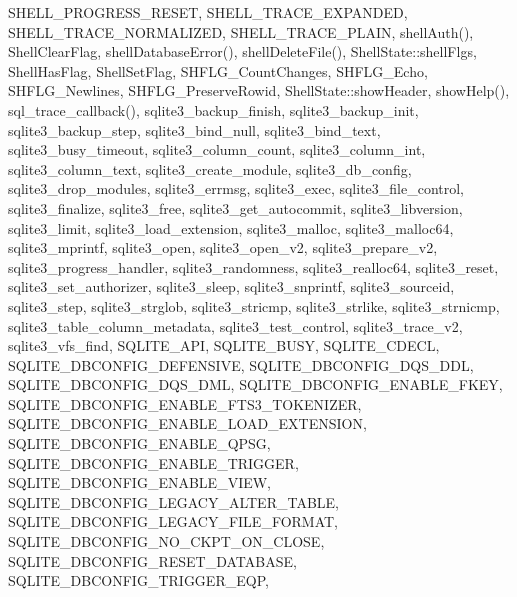 S\+H\+E\+L\+L\+\_\+\+P\+R\+O\+G\+R\+E\+S\+S\+\_\+\+R\+E\+S\+ET, S\+H\+E\+L\+L\+\_\+\+T\+R\+A\+C\+E\+\_\+\+E\+X\+P\+A\+N\+D\+ED, S\+H\+E\+L\+L\+\_\+\+T\+R\+A\+C\+E\+\_\+\+N\+O\+R\+M\+A\+L\+I\+Z\+ED, S\+H\+E\+L\+L\+\_\+\+T\+R\+A\+C\+E\+\_\+\+P\+L\+A\+IN, shell\+Auth(), Shell\+Clear\+Flag, shell\+Database\+Error(), shell\+Delete\+File(), Shell\+State\+::shell\+Flgs, Shell\+Has\+Flag, Shell\+Set\+Flag, S\+H\+F\+L\+G\+\_\+\+Count\+Changes, S\+H\+F\+L\+G\+\_\+\+Echo, S\+H\+F\+L\+G\+\_\+\+Newlines, S\+H\+F\+L\+G\+\_\+\+Preserve\+Rowid, Shell\+State\+::show\+Header, show\+Help(), sql\+\_\+trace\+\_\+callback(), sqlite3\+\_\+backup\+\_\+finish, sqlite3\+\_\+backup\+\_\+init, sqlite3\+\_\+backup\+\_\+step, sqlite3\+\_\+bind\+\_\+null, sqlite3\+\_\+bind\+\_\+text, sqlite3\+\_\+busy\+\_\+timeout, sqlite3\+\_\+column\+\_\+count, sqlite3\+\_\+column\+\_\+int, sqlite3\+\_\+column\+\_\+text, sqlite3\+\_\+create\+\_\+module, sqlite3\+\_\+db\+\_\+config, sqlite3\+\_\+drop\+\_\+modules, sqlite3\+\_\+errmsg, sqlite3\+\_\+exec, sqlite3\+\_\+file\+\_\+control, sqlite3\+\_\+finalize, sqlite3\+\_\+free, sqlite3\+\_\+get\+\_\+autocommit, sqlite3\+\_\+libversion, sqlite3\+\_\+limit, sqlite3\+\_\+load\+\_\+extension, sqlite3\+\_\+malloc, sqlite3\+\_\+malloc64, sqlite3\+\_\+mprintf, sqlite3\+\_\+open, sqlite3\+\_\+open\+\_\+v2, sqlite3\+\_\+prepare\+\_\+v2, sqlite3\+\_\+progress\+\_\+handler, sqlite3\+\_\+randomness, sqlite3\+\_\+realloc64, sqlite3\+\_\+reset, sqlite3\+\_\+set\+\_\+authorizer, sqlite3\+\_\+sleep, sqlite3\+\_\+snprintf, sqlite3\+\_\+sourceid, sqlite3\+\_\+step, sqlite3\+\_\+strglob, sqlite3\+\_\+stricmp, sqlite3\+\_\+strlike, sqlite3\+\_\+strnicmp, sqlite3\+\_\+table\+\_\+column\+\_\+metadata, sqlite3\+\_\+test\+\_\+control, sqlite3\+\_\+trace\+\_\+v2, sqlite3\+\_\+vfs\+\_\+find, S\+Q\+L\+I\+T\+E\+\_\+\+A\+PI, S\+Q\+L\+I\+T\+E\+\_\+\+B\+U\+SY, S\+Q\+L\+I\+T\+E\+\_\+\+C\+D\+E\+CL, S\+Q\+L\+I\+T\+E\+\_\+\+D\+B\+C\+O\+N\+F\+I\+G\+\_\+\+D\+E\+F\+E\+N\+S\+I\+VE, S\+Q\+L\+I\+T\+E\+\_\+\+D\+B\+C\+O\+N\+F\+I\+G\+\_\+\+D\+Q\+S\+\_\+\+D\+DL, S\+Q\+L\+I\+T\+E\+\_\+\+D\+B\+C\+O\+N\+F\+I\+G\+\_\+\+D\+Q\+S\+\_\+\+D\+ML, S\+Q\+L\+I\+T\+E\+\_\+\+D\+B\+C\+O\+N\+F\+I\+G\+\_\+\+E\+N\+A\+B\+L\+E\+\_\+\+F\+K\+EY, S\+Q\+L\+I\+T\+E\+\_\+\+D\+B\+C\+O\+N\+F\+I\+G\+\_\+\+E\+N\+A\+B\+L\+E\+\_\+\+F\+T\+S3\+\_\+\+T\+O\+K\+E\+N\+I\+Z\+ER, S\+Q\+L\+I\+T\+E\+\_\+\+D\+B\+C\+O\+N\+F\+I\+G\+\_\+\+E\+N\+A\+B\+L\+E\+\_\+\+L\+O\+A\+D\+\_\+\+E\+X\+T\+E\+N\+S\+I\+ON, S\+Q\+L\+I\+T\+E\+\_\+\+D\+B\+C\+O\+N\+F\+I\+G\+\_\+\+E\+N\+A\+B\+L\+E\+\_\+\+Q\+P\+SG, S\+Q\+L\+I\+T\+E\+\_\+\+D\+B\+C\+O\+N\+F\+I\+G\+\_\+\+E\+N\+A\+B\+L\+E\+\_\+\+T\+R\+I\+G\+G\+ER, S\+Q\+L\+I\+T\+E\+\_\+\+D\+B\+C\+O\+N\+F\+I\+G\+\_\+\+E\+N\+A\+B\+L\+E\+\_\+\+V\+I\+EW, S\+Q\+L\+I\+T\+E\+\_\+\+D\+B\+C\+O\+N\+F\+I\+G\+\_\+\+L\+E\+G\+A\+C\+Y\+\_\+\+A\+L\+T\+E\+R\+\_\+\+T\+A\+B\+LE, S\+Q\+L\+I\+T\+E\+\_\+\+D\+B\+C\+O\+N\+F\+I\+G\+\_\+\+L\+E\+G\+A\+C\+Y\+\_\+\+F\+I\+L\+E\+\_\+\+F\+O\+R\+M\+AT, S\+Q\+L\+I\+T\+E\+\_\+\+D\+B\+C\+O\+N\+F\+I\+G\+\_\+\+N\+O\+\_\+\+C\+K\+P\+T\+\_\+\+O\+N\+\_\+\+C\+L\+O\+SE, S\+Q\+L\+I\+T\+E\+\_\+\+D\+B\+C\+O\+N\+F\+I\+G\+\_\+\+R\+E\+S\+E\+T\+\_\+\+D\+A\+T\+A\+B\+A\+SE, S\+Q\+L\+I\+T\+E\+\_\+\+D\+B\+C\+O\+N\+F\+I\+G\+\_\+\+T\+R\+I\+G\+G\+E\+R\+\_\+\+E\+QP, 